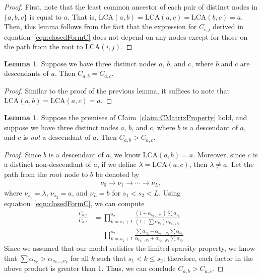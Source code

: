 \documentclass{article}
\theoremstyle{definition}
\newtheorem{lemma}[thm]{Lemma}
\begin{document}
\begin{proof}
First, note that the least common ancestor of each pair of distinct nodes in $\{a, b, c\}$ is equal to $a$.
That is, $\text{LCA}(a,b) = \text{LCA}(a,c) = \text{LCA}(b,c) = a$.
Then, this lemma follows from the fact that the expression for $C_{i,j}$ derived in equation~\eqref{eqn:closedFormC} does not depend on any nodes except for those on the path from the root to $\text{LCA}(i,j)$.
\end{proof}

\begin{lemma}
Suppose we have three distinct nodes $a$, $b$, and $c$, where $b$ and $c$ are descendants of $a$.
Then $C_{a,b} = C_{a,c}$.
\label{lemma:equalDescendant}
\end{lemma}

\begin{proof}
Similar to the proof of the previous lemma, it suffices to note that $\text{LCA}(a,b) = \text{LCA}(a,c) = a$.
\end{proof}

\begin{lemma}
Suppose the premises of Claim~\ref{claim:CMatrixProperty} hold, and suppose we have three distinct nodes $a$, $b$, and $c$, where $b$ is a descendant of $a$, and $c$ is \emph{not} a descendant of $a$.
Then $C_{a,b} > C_{a,c}$.
\label{lemma:greaterNonDescendant}
\end{lemma}

\begin{proof}
Since $b$ is a descendant of $a$, we know $\text{LCA}(a,b) = a$.
Moreover, since $c$ is a distinct non-descendant of $a$, if we define $\lambda = \text{LCA}(a, c)$, then $\lambda \neq a$.
Let the path from the root node to $b$ be denoted by
\begin{align}
\nu_0 \to \nu_1 \to \cdots \to \nu_L,
\end{align}
where $\nu_{s_1} = \lambda$, $\nu_{s_2} = a$, and $\nu_L = b$ for $s_1 < s_2 < L$.
Using equation~\eqref{eqn:closedFormC}, we can compute
\begin{align}
\frac{C_{a,b}}{C_{a,c}}
&=
\prod_{k=s_1+1}^{s_2}
\frac
  { \left( 1 + \alpha_{\nu_{k-1} \nu_k} \right) \sum \alpha_{\nu_k} }
  { \left( 1 + \sum \alpha_{\nu_k} \right) \alpha_{\nu_{k-1} \nu_k} }
\\
&=
\prod_{k=s_1+1}^{s_2}
\frac
  { \sum \alpha_{\nu_k} + \alpha_{\nu_{k-1} \nu_k} \sum \alpha_{\nu_k} }
  { \alpha_{\nu_{k-1} \nu_k} + \alpha_{\nu_{k-1} \nu_k} \sum \alpha_{\nu_k} }
\end{align}
%
Since we assumed that our model satisfies the limited-sparsity property, we know that $\sum \alpha_{\nu_k} > \alpha_{\nu_{k-1} \nu_k}$ for all $k$ such that $s_1 < k \leq s_2$; therefore, each factor in the above product is greater than $1$.
Thus, we can conclude $C_{a,b} > C_{a,c}$.
\end{proof}
\end{document}
